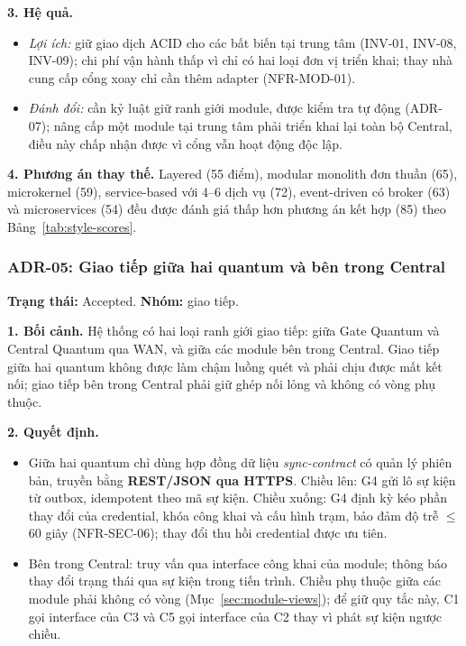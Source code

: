 \noindent\textbf{3. Hệ quả.}
\begin{itemize}
    \item \textit{Lợi ích:} giữ giao dịch ACID cho các bất biến tại trung tâm (INV-01, INV-08, INV-09); chi phí vận hành thấp vì chỉ có hai loại đơn vị triển khai; thay nhà cung cấp cổng xoay chỉ cần thêm adapter (NFR-MOD-01).
    \item \textit{Đánh đổi:} cần kỷ luật giữ ranh giới module, được kiểm tra tự động (ADR-07); nâng cấp một module tại trung tâm phải triển khai lại toàn bộ Central, điều này chấp nhận được vì cổng vẫn hoạt động độc lập.
\end{itemize}

\noindent\textbf{4. Phương án thay thế.} Layered (55 điểm), modular monolith đơn thuần (65), microkernel (59), service-based với 4--6 dịch vụ (72), event-driven có broker (63) và microservices (54) đều được đánh giá thấp hơn phương án kết hợp (85) theo Bảng~\ref{tab:style-scores}.

\subsubsection{ADR-05: Giao tiếp giữa hai quantum và bên trong Central}\label{adr:05}
\textbf{Trạng thái:} Accepted. \textbf{Nhóm:} giao tiếp.

\noindent\textbf{1. Bối cảnh.} Hệ thống có hai loại ranh giới giao tiếp: giữa Gate Quantum và Central Quantum qua WAN, và giữa các module bên trong Central. Giao tiếp giữa hai quantum không được làm chậm luồng quét và phải chịu được mất kết nối; giao tiếp bên trong Central phải giữ ghép nối lỏng và không có vòng phụ thuộc.

\noindent\textbf{2. Quyết định.}
\begin{itemize}
    \item Giữa hai quantum chỉ dùng hợp đồng dữ liệu \textit{sync-contract} có quản lý phiên bản, truyền bằng \textbf{REST/JSON qua HTTPS}. Chiều lên: G4 gửi lô sự kiện từ outbox, idempotent theo mã sự kiện. Chiều xuống: G4 định kỳ kéo phần thay đổi của credential, khóa công khai và cấu hình trạm, bảo đảm độ trễ $\le$ 60 giây (NFR-SEC-06); thay đổi thu hồi credential được ưu tiên.
    \item Bên trong Central: truy vấn qua interface công khai của module; thông báo thay đổi trạng thái qua sự kiện trong tiến trình. Chiều phụ thuộc giữa các module phải không có vòng (Mục~\ref{sec:module-views}); để giữ quy tắc này, C1 gọi interface của C3 và C5 gọi interface của C2 thay vì phát sự kiện ngược chiều.
\end{itemize}

